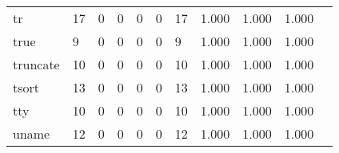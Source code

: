 \begin{longtable}{lp{1.2cm}p{1.2cm}p{1.2cm}p{1.2cm}p{1.2cm}p{1.2cm}p{1.2cm}p{1.2cm}p{1.2cm}p{1.2cm}}
tr        &                                    17 &                                                  0 &                                                  0 &                                                  0 &                                                  0 &                                                 17 &                                              1.000 &                                              1.000 &                                              1.000 \\
true      &                                     9 &                                                  0 &                                                  0 &                                                  0 &                                                  0 &                                                  9 &                                              1.000 &                                              1.000 &                                              1.000 \\
truncate  &                                    10 &                                                  0 &                                                  0 &                                                  0 &                                                  0 &                                                 10 &                                              1.000 &                                              1.000 &                                              1.000 \\
tsort     &                                    13 &                                                  0 &                                                  0 &                                                  0 &                                                  0 &                                                 13 &                                              1.000 &                                              1.000 &                                              1.000 \\
tty       &                                    10 &                                                  0 &                                                  0 &                                                  0 &                                                  0 &                                                 10 &                                              1.000 &                                              1.000 &                                              1.000 \\
uname     &                                    12 &                                                  0 &                                                  0 &                                                  0 &                                                  0 &                                                 12 &                                              1.000 &                                              1.000 &                                              1.000 \\

\end{longtable}
